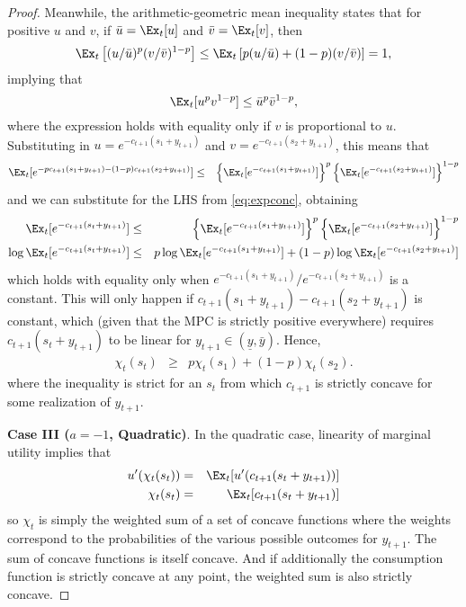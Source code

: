 \begin{proof}
	Meanwhile, the arithmetic-geometric mean inequality states that for positive $u$ and $v$, if $\bar u = \Ex_t [ u]$ and $\bar v = \Ex_t [ v]$, then
	\begin{equation*}
	\Ex_t\left[( u/\bar u)^p ( v/\bar v)^{1-p}\right]
	\leq \Ex_t \left[p ( u/\bar u)+(1-p)( v/\bar v)\right] = 1,
	\end{equation*}
	implying that
	\begin{equation*}
	\Ex_t [ u^p  v^{1-p}] \leq \bar u^p \bar v^{1-p},
	\end{equation*}
	where the expression holds with equality only if $v$ is proportional to $u$.  Substituting in $u= e^{-c_{t+1}(s_1 + {y}_{t+1})}$ and $v = e^{-c_{t+1}(s_2 + {y}_{t+1})}$, this means that
	\begin{eqnarray*}
	\Ex_t [e^{-p c_{t+1}(s_1 + {y}_{t+1}) - (1-p)c_{t+1}(s_2 + {y}_{t+1})}] & \leq &
	\left\{ \Ex_t  [e^{- c_{t+1}(s_1 + {y}_{t+1})} ] \right\}^p \left\{ \Ex_t  [e^{- c_{t+1}(s_2 + {y}_{t+1})} ] \right\}^{1-p}
	\end{eqnarray*}
	and we can substitute for the LHS from \eqref{eq:expconc}, obtaining
	\begin{eqnarray}
	\Ex_{t}[e^{-c_{t+1}(s_{t}+{y}_{t+1})}] & \leq &
	\left\{ \Ex_t  [e^{- c_{t+1}(s_1 + {y}_{t+1})} ] \right\}^p 	\left\{ \Ex_t  [e^{- c_{t+1}(s_2 + {y}_{t+1})} ] \right\}^{1-p} \nonumber
	\\
	\log \Ex_{t}[e^{-c_{t+1}(s_{t}+{y}_{t+1})}] &\leq &
	p \log \Ex_t  [e^{-c_{t+1}(s_1 + {y}_{t+1})} ]
	+ (1-p) \log \Ex_t  [e^{-c_{t+1}(s_2 + {y}_{t+1})} ]  \label{eq:expineq2}
	\end{eqnarray}
	which holds with equality only when $e^{-c_{t+1}(s_{1}+{y}_{t+1})}/e^{-c_{t+1}(s_{2}+{y}_{t+1})}$ is a constant. This will only happen if 	$c_{t+1}(s_{1}+{y}_{t+1})-c_{t+1}(s_{2}+{y}_{t+1})$ is constant, which (given that the MPC is strictly positive everywhere) requires 	$c_{t+1}(s_{t}+{y}_{t+1})$ to be linear for ${y}_{t+1} \in (\underline{y},\bar{y})$. Hence,
	\begin{eqnarray*}
	\chi_{t}(s_t) & \geq & p \chi_{t}(s_{1}) + (1-p) \chi_{t}(s_{2}).
	\end{eqnarray*}
	where the inequality is strict for an $s_{t}$ from which $c_{t+1}$ is strictly concave for some realization of ${y}_{t+1}$.
		
	\bigskip
	\noindent \textbf{Case III ($a = -1$, Quadratic)}.
	In the quadratic case, linearity of marginal utility implies that
	\begin{eqnarray*}
	u'(\chi_{t}(s_{t})) & = & \Ex_{t}[u'(c_{t+1}(s_{t}+{y}_{t+1}))]
	\\   \chi_{t}(s_{t}) & = & \Ex_{t}[c_{t+1}(s_{t}+{y}_{t+1})]
	\end{eqnarray*}
	so $\chi_{t}$ is simply the weighted sum of a set of
	concave functions where the weights correspond to the probabilities of the various possible outcomes for ${y}_{t+1}$. The sum of concave functions is itself concave. And if additionally the consumption function is strictly concave at any point, the weighted sum is also strictly concave.
	


\end{proof}
